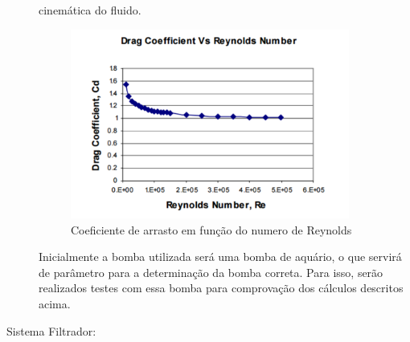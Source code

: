 \begin{description}
cinemática do fluido.
\par
\begin{figure}[h]
  \centering
  \includegraphics[width=0.9\textwidth]{figures/graphic-reynolds.png}
  \caption{Coeficiente de arrasto em função do numero de Reynolds}
  \label{fig:graphic-reynolds}
\end{figure}
\FloatBarrier
\par
Inicialmente a bomba utilizada será uma bomba de aquário, o que servirá de
parâmetro para a determinação da bomba correta. Para isso, serão realizados
testes com essa bomba para comprovação dos cálculos descritos acima.

\item[Sistema Filtrador:]
\end{description}